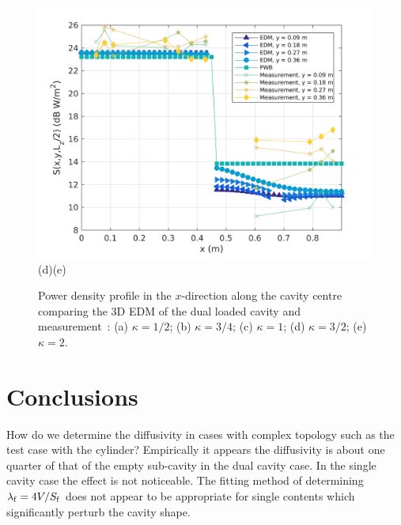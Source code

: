 \documentclass[a4paper]{article}
\numberwithin{equation}{section}
\begin{document}
\begin{figure}[hp]
\begin{center}
\includegraphics[width=0.49\linewidth]{figures/DDM-EEBC_3D_DL_PowerDensityProfileXMeas_JX_k2_0}\\
{\footnotesize (d)\hspace{75mm}(e)}\\
\vspace{-2mm}
\caption{\label{fg:measprofsdlk} Power density profile in the $x$-direction along the cavity centre comparing
the 3D EDM of the dual loaded cavity and measurement~\citep{Flintoft2017b}: (a) $\kappa=1/2$; (b) $\kappa=3/4$;
(c) $\kappa=1$; (d) $\kappa=3/2$; (e) $\kappa=2$.}
\end{center}
\end{figure}

\clearpage

\section[Conclusions]{Conclusions}
\label{sc:conc}

How do we determine the diffusivity in cases with complex topology such as
the test case with the cylinder? Empirically it appears the diffusivity is about one quarter of that
of the empty sub-cavity in the dual cavity case. In the single cavity case the effect is not
noticeable. The fitting method of determining $\lambda_{\mathrm{f}} = 4V/S_{\mathrm{f}}$ does not appear to be
appropriate for single contents which significantly perturb the cavity shape.


%

\end{document}
